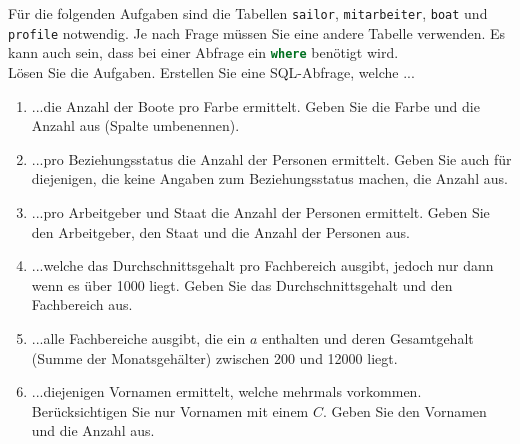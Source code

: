 Für die folgenden Aufgaben sind die Tabellen \lstinline{sailor}, \lstinline{mitarbeiter}, \lstinline{boat} und \lstinline{profile} notwendig. Je nach Frage müssen Sie eine andere Tabelle verwenden. Es kann auch sein, dass bei einer Abfrage ein \lstinline[language=SQL]{where} benötigt wird.\\

Lösen Sie die Aufgaben. Erstellen Sie eine \ac{SQL}-Abfrage, welche ...

\begin{enumerate}
\item ...die Anzahl der Boote pro Farbe ermittelt. Geben Sie die Farbe und die Anzahl aus (Spalte umbenennen).

\item ...pro Beziehungsstatus die Anzahl der Personen ermittelt. Geben Sie auch für diejenigen, die keine Angaben zum Beziehungsstatus machen, die Anzahl aus.

\item ...pro Arbeitgeber und Staat die Anzahl der Personen ermittelt. Geben Sie den Arbeitgeber, den Staat und die Anzahl der Personen aus.

\item ...welche das Durchschnittsgehalt pro Fachbereich ausgibt, jedoch nur dann wenn es über 1000 liegt. Geben Sie das Durchschnittsgehalt und den Fachbereich aus.

\item ...alle Fachbereiche ausgibt, die ein $a$ enthalten und deren Gesamtgehalt (Summe der Monatsgehälter) zwischen 200 und 12000 liegt.

\item ...diejenigen Vornamen ermittelt, welche mehrmals vorkommen. Berücksichtigen Sie nur Vornamen mit einem $C$. Geben Sie den Vornamen und die Anzahl aus.

\end{enumerate}

